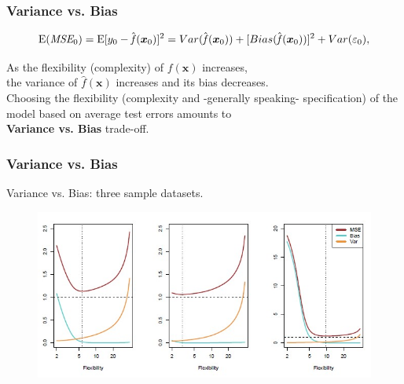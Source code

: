 \documentclass{beamer}
\begin{document}
\begin{frame}
\frametitle{Variance vs. Bias}

$$ \textnormal{E}(\textit{MSE}_0)
   =\textnormal{E}[y_0- \hat{\mathit{f}}(\bm{x}_0)]^2 
   = Var(\hat{\mathit{f}}(\bm{x}_0))
   + [Bias(\hat{\mathit{f}}(\bm{x}_0))]^2
   + Var(\varepsilon_0), $$

\vspace{0.5cm} 

As the flexibility (complexity) of ${\mathit{f}}(\bm{x})$ increases, 
\\the variance of $\hat{\mathit{f}}(\bm{x})$ increases and its bias decreases.
\vspace{0.5cm} 
\\Choosing the flexibility (complexity and -generally speaking- specification) of the model based on average test errors amounts to \\ 
\textbf{Variance vs. Bias} trade-off.



\end{frame}





\begin{frame}
\frametitle{Variance vs. Bias}

\begin{center}
Variance vs. Bias: three sample datasets.
\end{center}

\begin{figure}
\includegraphics[scale=0.5]{IMG/VarBias_ex_2.jpg}
\end{figure}

\end{frame}
\end{document}
